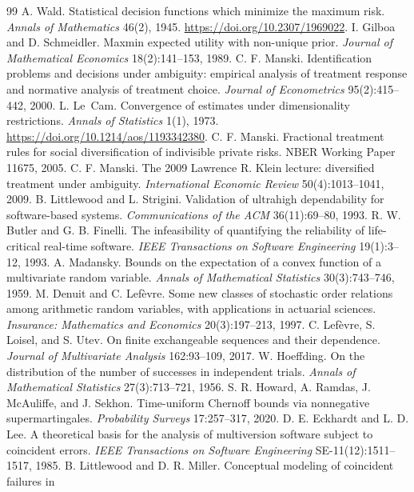 \documentclass[11pt]{article}
\theoremstyle{definition}
\theoremstyle{remark}
\begin{document}
\begin{thebibliography}{99}
 A. Wald. Statistical decision functions which minimize the maximum risk.
\emph{Annals of Mathematics} 46(2), 1945. \url{https://doi.org/10.2307/1969022}.
 I. Gilboa and D. Schmeidler. Maxmin expected utility with non-unique prior.
\emph{Journal of Mathematical Economics} 18(2):141--153, 1989.
 C. F. Manski. Identification problems and decisions under ambiguity: empirical
analysis of treatment response and normative analysis of treatment choice. \emph{Journal of
Econometrics} 95(2):415--442, 2000.
 L. Le~Cam. Convergence of estimates under dimensionality restrictions. \emph{Annals
of Statistics} 1(1), 1973. \url{https://doi.org/10.1214/aos/1193342380}.
 C. F. Manski. Fractional treatment rules for social diversification of indivisible
private risks. NBER Working Paper 11675, 2005.
 C. F. Manski. The 2009 Lawrence R. Klein lecture: diversified treatment under
ambiguity. \emph{International Economic Review} 50(4):1013--1041, 2009.
 B. Littlewood and L. Strigini. Validation of ultrahigh dependability for
software-based systems. \emph{Communications of the ACM} 36(11):69--80, 1993.
 R. W. Butler and G. B. Finelli. The infeasibility of quantifying the reliability of
life-critical real-time software. \emph{IEEE Transactions on Software Engineering} 19(1):3--12, 1993.
 A. Madansky. Bounds on the expectation of a convex function of a multivariate
random variable. \emph{Annals of Mathematical Statistics} 30(3):743--746, 1959.
 M. Denuit and C. Lef\`evre. Some new classes of stochastic order relations among
arithmetic random variables, with applications in actuarial sciences. \emph{Insurance: Mathematics and
Economics} 20(3):197--213, 1997.
 C. Lef\`evre, S. Loisel, and S. Utev. On finite exchangeable sequences and their
dependence. \emph{Journal of Multivariate Analysis} 162:93--109, 2017.
 W. Hoeffding. On the distribution of the number of successes in independent
trials. \emph{Annals of Mathematical Statistics} 27(3):713--721, 1956.
 S. R. Howard, A. Ramdas, J. McAuliffe, and J. Sekhon. Time-uniform Chernoff bounds
via nonnegative supermartingales. \emph{Probability Surveys} 17:257--317, 2020.
 D. E. Eckhardt and L. D. Lee. A theoretical basis for the analysis of multiversion
software subject to coincident errors. \emph{IEEE Transactions on Software Engineering}
SE-11(12):1511--1517, 1985.
 B. Littlewood and D. R. Miller. Conceptual modeling of coincident failures in

\end{thebibliography}
\end{document}
